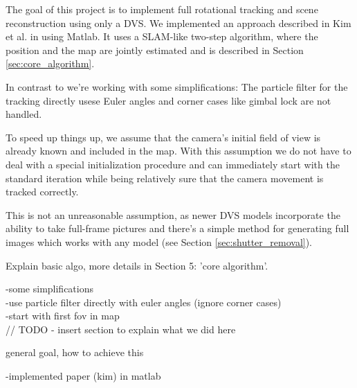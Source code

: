 The goal of this project is to implement full rotational tracking and scene
reconstruction using only a DVS. We implemented an approach described in Kim et
al. in \cite{kim2014simultaneous} using Matlab. It uses a SLAM-like two-step
algorithm, where the position and the map are jointly estimated and is
described in Section \ref{sec:core_algorithm}.

In contrast to \cite{kim2014simultaneous} we're working with some
simplifications: The particle filter for the tracking directly usese Euler
angles and corner cases like gimbal lock are not handled.

To speed up things up, we assume that the camera's initial field
of view is already known and included in the map. With this assumption we do
not have to deal with a special initialization procedure and can immediately
start with the standard iteration while being relatively sure that the camera
movement is tracked correctly.

This is not an unreasonable assumption, as newer DVS models incorporate the
ability to take full-frame pictures and there's a simple method for generating
full images which works with any model (see Section \ref{sec:shutter_removal}).





Explain basic algo, more details in Section 5: 'core algorithm'.


-some simplifications\\
    -use particle filter directly with euler angles (ignore corner cases)\\
    -start with first fov in map\\





// TODO - insert section to explain what we did here

general goal, how to achieve this

-implemented paper (kim) in matlab\\

